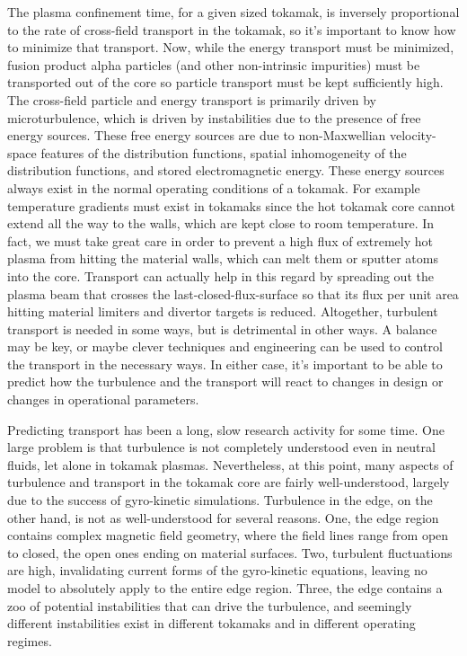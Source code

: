 The plasma confinement time, for a given sized tokamak, is inversely proportional to the rate of cross-field transport in the tokamak, so it's important to know how to minimize that
transport. Now, while the energy transport must be minimized, fusion product alpha particles (and other non-intrinsic impurities) must be transported out of the core so particle transport
must be kept sufficiently high. The cross-field particle and energy transport is primarily driven by microturbulence, which is driven by instabilities due to the presence of free energy sources.
These free energy sources are due to non-Maxwellian velocity-space features of the distribution functions, spatial inhomogeneity of the distribution functions, and stored electromagnetic energy.
These energy sources always exist in the normal operating conditions of a tokamak. For example temperature gradients must exist in tokamaks
since the hot tokamak core cannot extend all the way to the walls, which are kept close to room temperature. In fact, we must take great care in order to prevent a high flux of extremely
hot plasma from hitting the material walls, which can melt them or sputter atoms into the core. 
Transport can actually help in this regard by spreading out the plasma beam that crosses the last-closed-flux-surface so that its flux
per unit area hitting material limiters and divertor targets is reduced. Altogether, turbulent transport is needed in some ways, but is detrimental in other ways. A balance may be key,
or maybe clever techniques and engineering can be used to control the transport in the necessary ways. In either case, it's important to be able to predict how the turbulence and the
transport will react to changes in design or changes in operational parameters. 

Predicting transport has been a long, slow research activity for some time. One large problem is that turbulence is not completely understood even in neutral fluids,
let alone in tokamak plasmas. Nevertheless, at this point, many aspects of turbulence and transport in the tokamak core are fairly well-understood, largely
due to the success of gyro-kinetic simulations. Turbulence in the edge, on the other hand, is not as well-understood for several reasons. One, the edge region contains complex magnetic
field geometry, where the field lines range from open to closed, the open ones ending on material surfaces. Two, turbulent fluctuations are high, invalidating current forms of the
gyro-kinetic equations, leaving no model to absolutely apply to the entire edge region. Three, the edge contains a zoo of potential instabilities that can drive the turbulence,
and seemingly different instabilities exist in different tokamaks and in different operating regimes.

